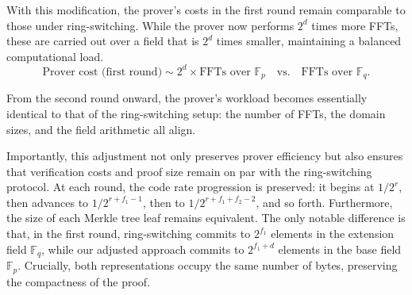 \documentclass{article}
\newcommand{\Fp}{\mathbb F_p}
\newcommand{\Fq}{\mathbb F_q}
\begin{document}
With this modification, the prover’s costs in the first round remain comparable to those under ring-switching. While the prover now performs $2^d$ times more FFTs, these are carried out over a field that is $2^d$ times smaller, maintaining a balanced computational load.
$$
\text{Prover cost (first round)} \sim 2^d \times \text{FFTs over } \Fp \quad \text{vs.} \quad \text{FFTs over } \Fq.
$$

From the second round onward, the prover’s workload becomes essentially identical to that of the ring-switching setup: the number of FFTs, the domain sizes, and the field arithmetic all align.

Importantly, this adjustment not only preserves prover efficiency but also ensures that verification costs and proof size remain on par with the ring-switching protocol. At each round, the code rate progression is preserved: it begins at $1/2^r$, then advances to $1/2^{r + f_1 - 1}$, then to $1/2^{r + f_1 + f_2 - 2}$, and so forth. Furthermore, the size of each Merkle tree leaf remains equivalent. The only notable difference is that, in the first round, ring-switching commits to $2^{f_1}$ elements in the extension field $\Fq$, while our adjusted approach commits to $2^{f_1 + d}$ elements in the base field $\Fp$. Crucially, both representations occupy the same number of bytes, preserving the compactness of the proof.





\end{document}
